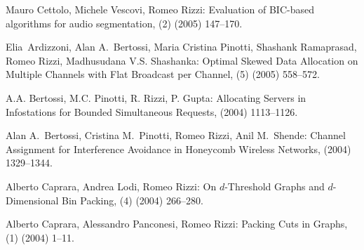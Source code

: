\begin{etaremune}
  \item {\sc Mauro Cettolo, Michele Vescovi, Romeo Rizzi:}
   \newblock  Evaluation of BIC-based algorithms for audio segmentation,
   (2) (2005) 147--170.

  \item {\sc Elia~Ardizzoni, Alan A.~Bertossi, Maria Cristina Pinotti,
                  Shashank Ramaprasad,  Romeo Rizzi,  Madhusudana V.S. Shashanka:}
   \newblock  Optimal Skewed Data Allocation on Multiple Channels with Flat
              Broadcast per Channel,
   (5) (2005) 558--572.

  \item {\sc A.A. Bertossi, M.C. Pinotti, R. Rizzi, P. Gupta:} %
   \newblock  Allocating Servers in Infostations for Bounded Simultaneous Requests,
    (2004) 1113--1126.

  \item {\sc Alan A.~Bertossi, Cristina M.~Pinotti, Romeo Rizzi, Anil M.~Shende:}
   \newblock  Channel Assignment for Interference Avoidance in Honeycomb Wireless Networks,
    (2004) 1329--1344.

  \item {\sc Alberto Caprara, Andrea Lodi, Romeo Rizzi:}
   \newblock  On $d$-Threshold Graphs and $d$-Dimensional Bin Packing,
   (4) (2004) 266--280.

  \item {\sc Alberto Caprara, Alessandro Panconesi, Romeo Rizzi:}
   \newblock  Packing Cuts in Graphs,
   (1) (2004) 1--11.


\end{etaremune}
